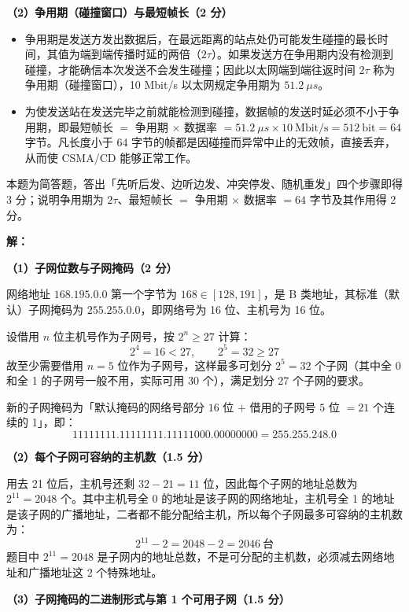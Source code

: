 \documentclass[a4paper,11pt]{article}
\begin{document}
\textbf{（2）争用期（碰撞窗口）与最短帧长（2 分）}
\begin{itemize}[leftmargin=2em, itemsep=2pt, topsep=3pt]
  \item 争用期是发送方发出数据后，在最远距离的站点处仍可能发生碰撞的最长时间，其值为端到端传播时延的两倍（\(2\tau\)）。如果发送方在争用期内没有检测到碰撞，才能确信本次发送不会发生碰撞；因此以太网端到端往返时间 \(2\tau\) 称为争用期（碰撞窗口），10 Mbit/s 以太网规定争用期为 \(51.2\ \mu s\)。
  \item 为使发送站在发送完毕之前就能检测到碰撞，数据帧的发送时延必须不小于争用期，即最短帧长 \(=\) 争用期 \(\times\) 数据率 \(=51.2\ \mu s\times 10\ \mathrm{Mbit/s}=512\ \mathrm{bit}=64\) 字节。凡长度小于 64 字节的帧都是因碰撞而异常中止的无效帧，直接丢弃，从而使 CSMA/CD 能够正常工作。
\end{itemize}
\begin{analysis}
本题为简答题，答出「先听后发、边听边发、冲突停发、随机重发」四个步骤即得 3 分；说明争用期为 \(2\tau\)、最短帧长 \(=\) 争用期 \(\times\) 数据率 \(=64\) 字节及其作用得 2 分。
\end{analysis}

\q \textbf{解：}

\textbf{（1）子网位数与子网掩码（2 分）}

网络地址 \(168.195.0.0\) 第一个字节为 \(168\in[128,191]\)，是 B 类地址，其标准（默认）子网掩码为 \(255.255.0.0\)，即网络号为 16 位、主机号为 16 位。

设借用 \(n\) 位主机号作为子网号，按 \(2^{n}\ge 27\) 计算：
\[
2^{4}=16<27,\qquad 2^{5}=32\ge 27
\]
故至少需要借用 \(n=5\) 位作为子网号，这样最多可划分 \(2^{5}=32\) 个子网（其中全 0 和全 1 的子网号一般不用，实际可用 30 个），满足划分 27 个子网的要求。

新的子网掩码为「默认掩码的网络号部分 \(16\) 位 \(+\) 借用的子网号 \(5\) 位 \(=21\) 个连续的 1」，即：
\[
11111111.11111111.11111000.00000000=255.255.248.0
\]

\textbf{（2）每个子网可容纳的主机数（1.5 分）}

用去 21 位后，主机号还剩 \(32-21=11\) 位，因此每个子网的地址总数为 \(2^{11}=2048\) 个。其中主机号全 0 的地址是该子网的网络地址，主机号全 1 的地址是该子网的广播地址，二者都不能分配给主机，所以每个子网最多可容纳的主机数为：
\[
2^{11}-2=2048-2=2046\ \text{台}
\]
题目中 \(2^{11}=2048\) 是子网内的地址总数，不是可分配的主机数，必须减去网络地址和广播地址这 2 个特殊地址。

\textbf{（3）子网掩码的二进制形式与第 1 个可用子网（1.5 分）}
\end{document}
